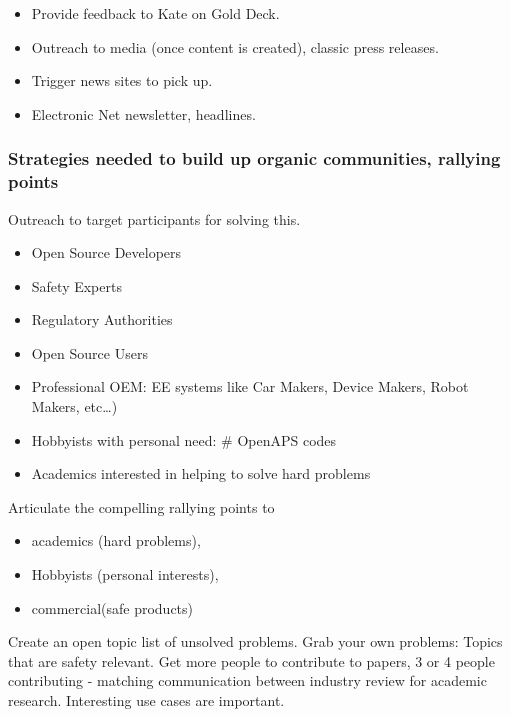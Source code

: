 \documentclass[12pt]{../Common_files/ElisaPaper}
\begin{document}
\begin{itemize}
	\item Provide feedback to Kate on Gold Deck.
	\item Outreach to media (once content is created),  classic press releases.
	\item Trigger news sites to pick up.
	\item Electronic Net newsletter,  headlines.
\end{itemize}


\subsubsection{Strategies needed to build up organic communities,  rallying points}
Outreach to target participants for solving this.
\begin{itemize}
	\item Open Source Developers 
	\item Safety Experts
	\item Regulatory Authorities
	\item Open Source Users 
	\item Professional OEM:  EE systems like  Car Makers, Device Makers, Robot Makers, etc…)
	\item Hobbyists with personal need:  \# OpenAPS codes
	\item Academics interested in helping to solve hard problems
\end{itemize}

Articulate the compelling rallying points to 
\begin{itemize}
	\item academics (hard problems), 
	\item Hobbyists (personal interests),
	\item commercial(safe products)    
\end{itemize}

Create an open topic list of unsolved problems.  
Grab your own problems:
Topics that are safety relevant.    
Get more people to contribute to papers,  3 or 4 people contributing - matching communication between industry review for academic research. 
Interesting use cases are important. 
\end{document}
